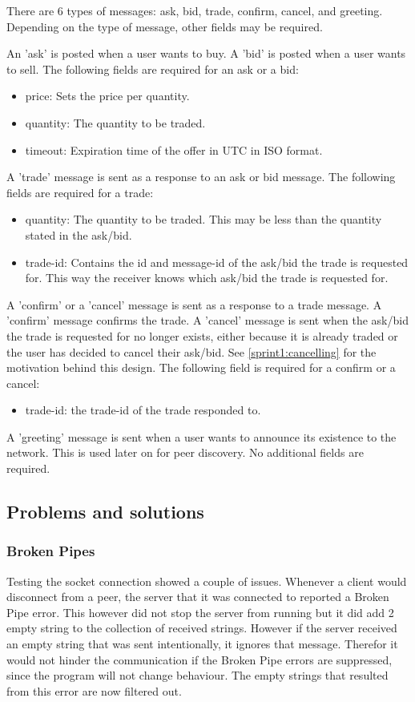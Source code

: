 \documentclass[]{article}
\newenvironment{myitemize}
{ \begin{itemize}
    \setlength{\itemsep}{0pt}
    \setlength{\parskip}{0pt}
    \setlength{\parsep}{0pt}     }
{ \end{itemize}                  }
\begin{document}
There are 6 types of messages: ask, bid, trade, confirm, cancel, and greeting.
Depending on the type of message, other fields may be required.

An 'ask' is posted when a user wants to buy.
A 'bid' is posted when a user wants to sell.
The following fields are required for an ask or a bid:
\begin{myitemize}
	\item price: Sets the price per quantity.
	\item quantity: The quantity to be traded.
	\item timeout: Expiration time of the offer in UTC in ISO format.
\end{myitemize}

A 'trade' message is sent as a response to an ask or bid message.
The following fields are required for a trade:
\begin{myitemize}
	\item quantity: The quantity to be traded. This may be less than the quantity stated in the ask/bid.
	\item trade-id: Contains the id and message-id of the ask/bid the trade is requested for. This way the receiver knows which ask/bid the trade is requested for.
\end{myitemize}

A 'confirm' or a 'cancel' message is sent as a response to a trade message.
A 'confirm' message confirms the trade.
A 'cancel' message is sent when the ask/bid the trade is requested for no longer exists, either because it is already traded or the user has decided to cancel their ask/bid.
See \ref{sprint1:cancelling} for the motivation behind this design.
The following field is required for a confirm or a cancel:
\begin{myitemize}
\item trade-id: the trade-id of the trade responded to.
\end{myitemize}

A 'greeting' message is sent when a user wants to announce its existence to the network.
This is used later on for peer discovery.
No additional fields are required.

\subsection{Problems and solutions}
\subsubsection{Broken Pipes}
Testing the socket connection showed a couple of issues.
Whenever a client would disconnect from a peer, the server that it was connected to reported a Broken Pipe error.
This however did not stop the server from running but it did add 2 empty string to the collection of received strings.
However if the server received an empty string that was sent intentionally, it ignores that message.
Therefor it would not hinder the communication if the Broken Pipe errors are suppressed, since the program will not change behaviour.
The empty strings that resulted from this error are now filtered out.
\end{document}
